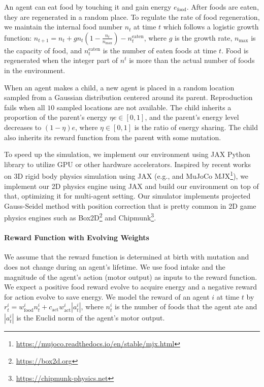 An agent can eat food by touching it and gain energy $e_{\mathrm{food}}$. After foods are eaten, they are regenerated in a random place. To regulate the rate of food regeneration, we maintain the internal food number $n_{t}$ at time $t$ which follows a logistic growth function: $n_{t + 1} = n_{t} + gn_{t}(1 - \frac{n_{t}}{n_{\mathrm{max}}}) - n_{t}^{\mathrm{eaten}}$, where $g$ is the growth rate, $n_{\mathrm{max}}$ is the capacity of food, and $n_{t}^{\mathrm{eaten}}$ is the number of eaten foods at time $t$. Food is regenerated when the integer part of $n^{t}$ is more than the actual number of foods in the environment.

When an agent makes a child, a new agent is placed in a random location sampled from a Gaussian distribution centered around its parent. Reproduction fails when all $10$ sampled locations are not available. The child inherits a proportion of the parent's energy $\eta e \in [0, 1]$, and the parent's energy level decreases to $(1-\eta)e$, where $\eta \in [0, 1]$ is the ratio of energy sharing. The child also inherits its reward function from the parent with some mutation.

To speed up the simulation, we implement our environment using JAX Python library \citep{jax2018github} to utilize GPU or other hardware accelerators. Inspired by recent works on 3D rigid body physics simulation using JAX (e.g., \citet{brax2021github} and MuJoCo \citep{todorov2012mujoco} MJX\footnote{\url{https://mujoco.readthedocs.io/en/stable/mjx.html}}), we implement our 2D physics engine using JAX and build our environment on top of that, optimizing it for multi-agent setting. Our simulator implements projected Gauss-Seidel method with position correction \citep{catto2005iterative} that is pretty common in 2D game physics engines such as Box2D\footnote{\url{https://box2d.org}} and Chipmunk\footnote{\url{https://chipmunk-physics.net}}.

\paragraph{Reward Function with Evolving Weights}
We assume that the reward function is determined at birth with mutation and does not change during an agent's lifetime. We use food intake and the magnitude of the agent's action (motor output) as inputs to the reward function. We expect a positive food reward evolve to acquire energy and a negative reward for action evolve to save energy.
We model the reward of an agent $i$ at time $t$ by $r^{i}_{t} = w_{\mathrm{food}}^{i}n_{t}^{i} + c_{\mathrm{act}} w_{\mathrm{act}}^{i}|a_{t}^{i}|$, where $n_{t}^{i}$ is the number of foods that the agent ate and $|a_{t}^{i}|$ is the Euclid norm of the agent's motor output.

